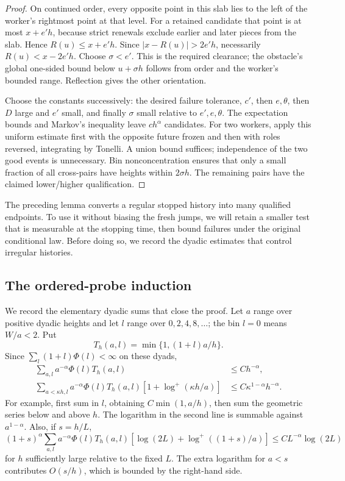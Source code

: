 \begin{proof}
On continued order, every opposite point in this slab lies to the left
of the worker's rightmost point at that level. For a retained candidate
that point is at most \(x+e'h\), because strict renewals exclude earlier
and later pieces from the slab. Hence \(R(u)\le x+e'h\). Since
\(|x-R(u)|>2e'h\), necessarily \(R(u)<x-2e'h\). Choose
\(\sigma<e'\). This is the required clearance; the obstacle's global
one-sided bound below \(u+\sigma h\) follows from order and the worker's
bounded range. Reflection gives the other orientation.

Choose the constants successively: the desired failure tolerance,
\(c'\), then \(e,\theta\), then \(D\) large and \(e'\) small, and finally
\(\sigma\) small relative to \(e',e,\theta\). The expectation bounds and
Markov's inequality leave \(ch^\alpha\) candidates. For two workers,
apply this uniform estimate first with the opposite future frozen and
then with roles reversed, integrating by Tonelli. A union bound suffices;
independence of the two good events is unnecessary. Bin nonconcentration
ensures that only a small fraction of all cross-pairs have heights
within \(2\sigma h\). The remaining pairs have the claimed lower/higher
qualification.
\end{proof}

The preceding lemma converts a regular stopped history into many
qualified endpoints. To use it without biasing the fresh jumps, we
will retain a smaller test that is measurable at the stopping time,
then bound failures under the original conditional law. Before doing
so, we record the dyadic estimates that control irregular histories.

\subsection{The ordered-probe induction}

We record the elementary dyadic sums that close the proof. Let \(a\)
range over positive dyadic heights and let \(l\) range over
\(0,2,4,8,\ldots\); the bin \(l=0\) means \(W/a<2\). Put
\[
 T_h(a,l)=\min\{1,(1+l)a/h\}.
\]
Since \(\sum_l(1+l)\Phi(l)<\infty\) on these dyads,
\begin{align}
 \sum_{a,l}a^{-\alpha}\Phi(l)T_h(a,l)&\le Ch^{-\alpha},
 \label{eq:10-charge-sum}\\
 \sum_{a<\kappa h,l}a^{-\alpha}\Phi(l)T_h(a,l)
        [1+\log^+(\kappa h/a)]
 &\le C\kappa^{1-\alpha}h^{-\alpha}.
 \label{eq:10-small-charge-sum}
\end{align}
For example, first sum in \(l\), obtaining
\(C\min(1,a/h)\), then sum the geometric series below and above \(h\).
The logarithm in the second line is summable against
\(a^{1-\alpha}\). Also, if \(s=h/L\),
\begin{equation}
 (1+s)^\alpha\sum_{a,l}a^{-\alpha}\Phi(l)T_h(a,l)
 [\log(2L)+\log^+((1+s)/a)]
 \le CL^{-\alpha}\log(2L)
 \label{eq:10-comparable-charge-sum}
\end{equation}
for \(h\) sufficiently large relative to the fixed \(L\). The extra
logarithm for \(a<s\) contributes \(O(s/h)\), which is bounded by the
right-hand side.


